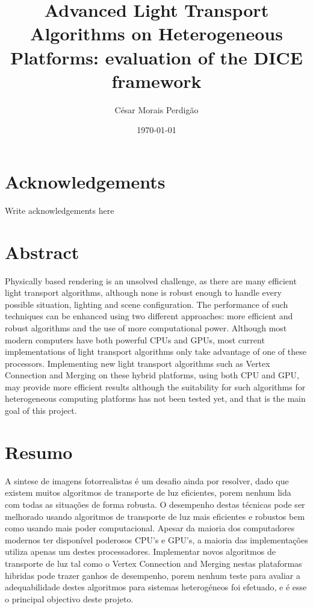 \documentclass[
  oneside,
  11pt, a4paper,
  footinclude=true,
  headinclude=true,
  cleardoublepage=empty
]{scrbook}
\title{Advanced Light Transport Algorithms on Heterogeneous Platforms: evaluation of the DICE framework}
\author{César Morais Perdigão}
\date{\today}
\begin{document}
	

    
\sf
	\thispagestyle{empty}
	
\rm
	\cleardoublepage

\chapter*{Acknowledgements}
Write acknowledgements here

	\cleardoublepage
	
\chapter*{Abstract}
Physically based rendering is an unsolved challenge, as there are many efficient light transport algorithms, although none is robust enough to handle every possible situation, lighting and scene configuration. The performance of such techniques can be enhanced using two different approaches: more efficient and robust algorithms and the use of more computational power. Although most modern computers have both powerful CPUs and GPUs, most current implementations of light transport algorithms only take advantage of one of these processors. Implementing new light transport algorithms such as Vertex Connection and Merging on these hybrid platforms, using both CPU and GPU, may provide more efficient results although the suitability for such algorithms for heterogeneous computing platforms has not been tested yet, and that is the main goal of this project.

	\cleardoublepage

\chapter*{Resumo}
A sintese de imagens fotorrealistas é um desafio ainda por resolver, dado que existem muitos algoritmos de transporte de luz eficientes, porem nenhum lida com todas as situações de forma robusta. O desempenho destas técnicas pode ser melhorado usando algoritmos de transporte de luz mais eficientes e robustos bem como usando mais poder computacional. Apesar da maioria dos computadores modernos ter disponível poderosos CPU's e GPU's, a maioria das implementações utiliza apenas um destes processadores. Implementar novos algoritmos de transporte de luz tal como o Vertex Connection and Merging nestas plataformas hibridas pode trazer ganhos de desempenho, porem nenhum teste para avaliar a adequabilidade destes algoritmos para sistemas heterogéneos foi efetuado, e é esse o principal objectivo deste projeto.
\end{document}
